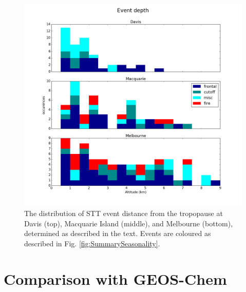 \documentclass{article}
\begin{document}
  \begin{figure}[!htbp]
    \begin{center}
    \includegraphics[width=0.99\columnwidth]{figures/summary_depth.png}
    \caption{The distribution of STT event distance from the tropopause at Davis (top), Macquarie Island (middle), and Melbourne (bottom), determined as described in the text.
    Events are coloured as described in Fig. \ref{fig:SummarySeasonality}.}
    \label{fig:SummaryTPDepths}
    \end{center}
  \end{figure}

\section{Comparison with GEOS-Chem}
  
\end{document}
